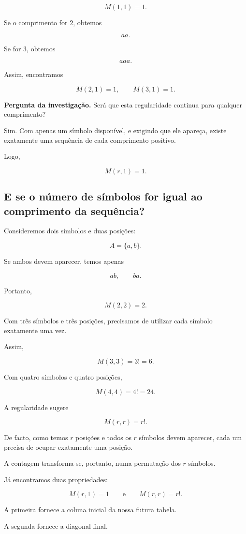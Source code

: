 \documentclass[11pt,a4paper,oneside]{book}
\newcommand{\Pergunta}[1]{\begin{perguntabox}\textbf{Pergunta da investigação.} #1\end{perguntabox}}
\begin{document}
\[
M(1,1)=1.
\]

Se o comprimento for $2$, obtemos

\[
aa.
\]

Se for $3$, obtemos

\[
aaa.
\]

Assim, encontramos

\[
M(2,1)=1,\qquad M(3,1)=1.
\]

\Pergunta{Será que esta regularidade continua
para qualquer comprimento?}

Sim. Com apenas um símbolo disponível,
e exigindo que ele apareça, existe
exatamente uma sequência de cada
comprimento positivo.

Logo,

\[
\boxed{M(r,1)=1}.
\]

\subsection*{E se o número de símbolos for igual
ao comprimento da sequência?}

Consideremos dois símbolos e duas posições:

\[
A=\{a,b\}.
\]

Se ambos devem aparecer, temos apenas

\[
ab,\qquad ba.
\]

Portanto,

\[
M(2,2)=2.
\]

Com três símbolos e três posições,
precisamos de utilizar cada símbolo
exatamente uma vez.

Assim,

\[
M(3,3)=3!=6.
\]

Com quatro símbolos e quatro posições,

\[
M(4,4)=4!=24.
\]

A regularidade sugere

\[
\boxed{M(r,r)=r!}.
\]

De facto, como temos $r$ posições
e todos os $r$ símbolos devem aparecer,
cada um precisa de ocupar exatamente
uma posição.

A contagem transforma-se, portanto,
numa permutação dos $r$ símbolos.

Já encontramos duas propriedades:

\[
M(r,1)=1
\qquad\text{e}\qquad
M(r,r)=r!.
\]

A primeira fornece a coluna inicial
da nossa futura tabela.

A segunda fornece a diagonal final.
\end{document}
